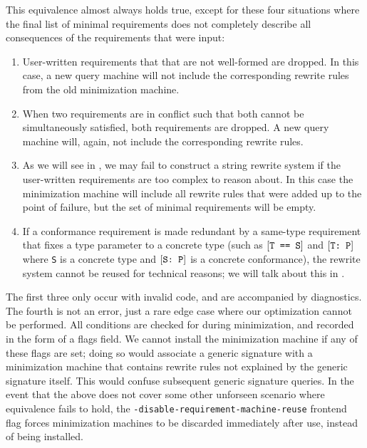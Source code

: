 \documentclass[../generics]{subfiles}
\begin{document}
This equivalence almost always holds true, except for these four situations where the final list of minimal requirements does not completely describe all consequences of the requirements that were input:
\begin{enumerate}
\item User-written requirements that that are not well-formed are dropped. In this case, a new query machine will not include the corresponding rewrite rules from the old minimization machine.

\item When two requirements are in conflict such that both cannot be simultaneously satisfied, both requirements are dropped. A new query machine will, again, not include the corresponding rewrite rules.

\item As we will see in , we may fail to construct a string rewrite system if the user-written requirements are too complex to reason about. In this case the minimization machine will include all rewrite rules that were added up to the point of failure, but the set of minimal requirements will be empty.

\item If a conformance requirement is made redundant by a same-type requirement that fixes a type parameter to a concrete type (such as $[\texttt{T == S}]$ and $[\texttt{T:~P}]$ where \texttt{S} is a concrete type and $[\texttt{S:~P}]$ is a concrete conformance), the rewrite system cannot be reused for technical reasons; we will talk about this in .
\end{enumerate}

The first three only occur with invalid code, and are accompanied by diagnostics. The fourth is not an error, just a rare edge case where our optimization cannot be performed. All conditions are checked for during minimization, and recorded in the form of a flags field. We cannot install the minimization machine if any of these flags are set; doing so would associate a generic signature with a minimization machine that contains rewrite rules not explained by the generic signature itself. This would confuse subsequent generic signature queries. In the event that the above does not cover some other unforseen scenario where equivalence fails to hold, the \texttt{-disable-requirement-machine-reuse} frontend flag forces minimization machines to be discarded immediately after use, instead of being installed.
\end{document}
